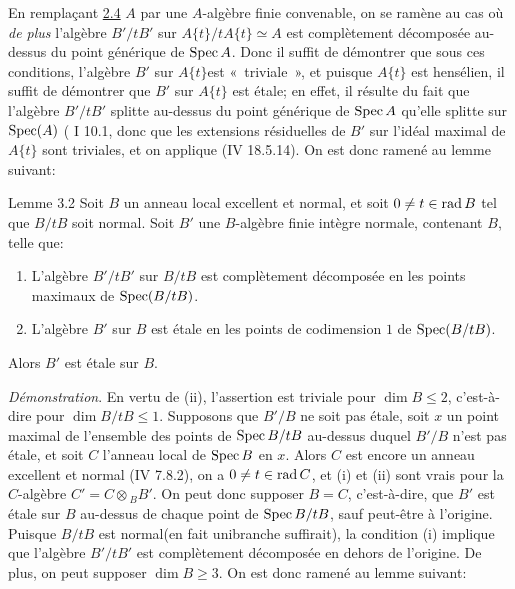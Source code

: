 \documentclass[10pt]{../fichiers-configuration-latex/smfart}
\begin{document}
En remplaçant \sisi{(}{}\hyperref[XV.cor2.4]{2.4}\sisi{)}{} $A$ par une $A$-algèbre finie convenable, on se
ramène au cas où \emph{de plus} l'algèbre $B'/tB'$ sur
$A\{t\}/tA\{t\}\simeq A$ est complètement décomposée au-dessus du
point générique de $\operatorname{Spec} A$. Donc il suffit de démontrer que sous ces
conditions, l'algèbre $B'$ sur $A\{t\}$\pageoriginale est
« triviale », et puisque $A\{t\}$ est hensélien, il suffit de démontrer que
$B'$ sur $A\{t\}$ est étale; en effet, il résulte du fait que
l'algèbre $B'/tB'$ splitte au-dessus du point générique de $\operatorname{Spec} A$
qu'elle splitte sur $\operatorname{Spec}(A)$ ( I 10.1\sisi{)}{}, donc que les extensions
résiduelles de $B'$ sur l'idéal maximal de $A\{t\}$ sont triviales, et
on applique (\EGA IV 18.5.14). On est donc ramené au lemme suivant:

\begin{enonce*}{Lemme 3.2}
Soit $B$ un anneau local excellent et normal, et soit $0\neq t\in \operatorname{rad}
B$ tel que $B/tB$ soit normal. Soit $B'$ une $B$-algèbre finie intègre
normale, contenant $B$, telle que:
\begin{enumerate}
\renewcommand{\theenumi}{\roman{enumi}}
\renewcommand{\labelenumi}{(\theenumi)}
\item L'algèbre $B'/tB'$ sur $B/tB$ est complètement décomposée en les
points maximaux de $\operatorname{Spec}(B/tB)$.

\item L'algèbre $B'$ sur $B$ est étale en les points de codimension
$1$ de $\operatorname{Spec}(B/tB)$.
\end{enumerate}
Alors $B'$ est étale sur $B$.
\end{enonce*}

\noindent
\emph{Démonstration}. En vertu de (ii), l'assertion est triviale pour
$\dim B\leq 2$, c'est-à-dire pour $\dim B/tB\leq 1$. Supposons que
$B'/B$ ne soit pas étale, soit $x$ un point maximal de l'ensemble des
points de $\operatorname{Spec} B/tB$ au-dessus duquel $B'/B$ n'est pas étale, et
soit $C$ l'anneau local de $\operatorname{Spec} B$ en $x$. Alors $C$ est encore un
anneau excellent et normal (\EGA IV 7.8.2), on a $0\neq t\in\operatorname{rad} C$, et
(i) et (ii) sont vrais pour la $C$-algèbre $C'=C\otimes {}_BB'$. On
peut donc supposer $B=C$, c'est-à-dire, que $B'$ est étale sur $B$
au-dessus de chaque point de $\operatorname{Spec} B/tB$, sauf peut-être à
l'origine. Puisque $B/tB$ est normal\pageoriginale (en fait unibranche
suffirait), la condition (i) implique que l'algèbre $B'/tB'$ est
complètement décomposée en dehors de l'origine. De plus, on peut
supposer $\dim B\geq 3$. On est donc ramené au lemme suivant:
\end{document}
